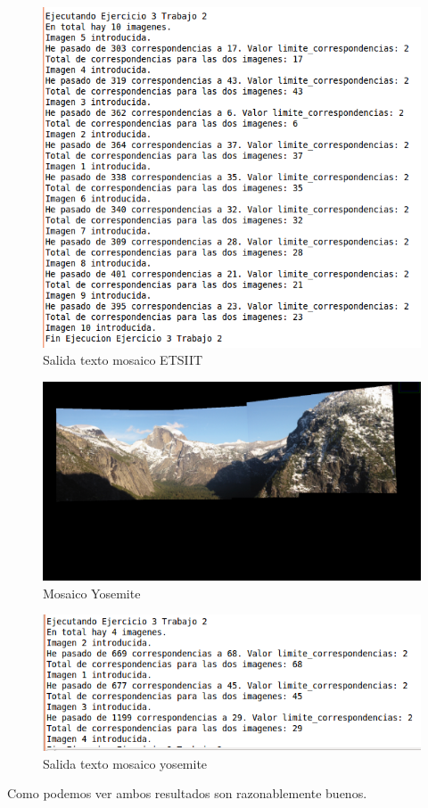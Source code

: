 \begin{figure}
	\centering
	\includegraphics[width=0.7\linewidth]{salidaTextoEj3_etsiit}
	\caption{Salida texto mosaico ETSIIT}
	\label{fig:salidatextoej3etsiit}
\end{figure}


\begin{figure}[H]
\centering
\includegraphics[width=1\linewidth]{salidaEj3Yosemite}
\caption{Mosaico Yosemite}
\label{fig:salidaej3yosemite}
\end{figure}

\begin{figure}[H]
\centering
\includegraphics[width=0.7\linewidth]{salidaTextoEj3_yosemite}
\caption{Salida texto mosaico yosemite}
\label{fig:salidatextoej3yosemite}
\end{figure}

Como podemos ver ambos resultados son razonablemente buenos.

